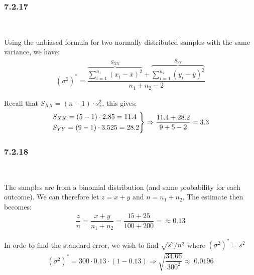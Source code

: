 \subsubsection{7.2.17}\hfill\\\par
\noindent Using the unbiased formula for two normally distributed samples with the same variance, we have:
\begin{equation*}
  \begin{gathered}
    (\sigma^2)^* = \dfrac{\overbrace{\sum_{i=1}^{n_1}(x_i-\overline{x})^2}^{\text{$S_{XX}$}}+\overbrace{\sum_{i=1}^{n_2}(y_i-\overline{y})^2}^{\text{$S_{YY}$}}}{n_1+n_2-2}
  \end{gathered}
\end{equation*}\par
\noindent Recall that $S_{XX} = (n-1)\cdot s_x^2$, this gives:
\begin{equation*}
  \begin{gathered}
    \begin{rcases}
      S_{XX} = (5-1)\cdot2.85 = 11.4\\
      S_{YY} = (9-1)\cdot3.525 = 28.2
    \end{rcases}\Rightarrow \dfrac{11.4+28.2}{9+5-2} = 3.3
  \end{gathered}
\end{equation*}
\par\bigskip
\subsubsection{7.2.18}\hfill\\\par
\noindent The samples are from a binomial distribution (and same probability for each outcome). We can therefore let $z = x+y$ and $n = n_1+n_2$. The estimate then becomes:
\begin{equation*}
  \begin{gathered}
    \dfrac{z}{n} = \dfrac{x+y}{n_1+n_2} = \dfrac{15+25}{100+200} = \approx 0.13
  \end{gathered}
\end{equation*}
\par\bigskip
\noindent In orde to find the standard error, we wish to find $\sqrt{s^2/n^2}$ where $(\sigma^2)^*=s^2$
\begin{equation*}
  \begin{gathered}
    (\sigma^2)^* = 300\cdot0.13\cdot(1-0.13)\Rightarrow\sqrt{\dfrac{34.66}{300^2}}\approx.0.0196
  \end{gathered}
\end{equation*}
\par\bigskip
